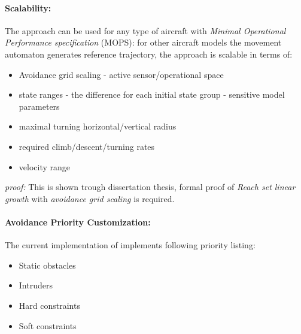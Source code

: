 \documentclass[12pt, a4paper]{report}
\theoremstyle{plain}
\theoremstyle{plain}
\theoremstyle{remark}
\begin{document}
\paragraph{Scalability:} The approach can be used for any type of aircraft with \emph{Minimal Operational Performance specification} (MOPS): for other aircraft models the movement automaton generates reference trajectory, the approach is scalable in terms of:
\begin{itemize}
    \item Avoidance grid scaling - active sensor/operational space
    \item state ranges - the difference for each initial state group - sensitive model parameters
    \item maximal turning horizontal/vertical radius
    \item required climb/descent/turning rates
    \item velocity range
\end{itemize}

\emph{proof:} This is shown trough dissertation thesis, formal proof of \emph{Reach set linear growth} with \emph{avoidance grid scaling} is required.

\paragraph{Avoidance Priority Customization:} The current implementation of implements following priority listing:
\begin{itemize}
    \item Static obstacles
    \item Intruders
    \item Hard constraints
    \item Soft constraints
\end{itemize}
\end{document}
